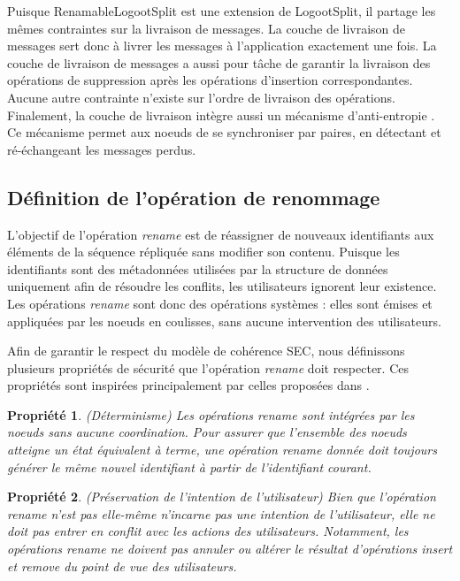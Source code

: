 \documentclass[12pt]{thesul}
\newtheorem{property}{Propriété}
\begin{document}
Puisque RenamableLogootSplit est une extension de LogootSplit, il partage les mêmes contraintes sur la livraison de messages.
La couche de livraison de messages sert donc à livrer les messages à l'application exactement une fois.
La couche de livraison de messages a aussi pour tâche de garantir la livraison des opérations de suppression après les opérations d'insertion correspondantes.
Aucune autre contrainte n'existe sur l'ordre de livraison des opérations.
Finalement, la couche de livraison intègre aussi un mécanisme d'anti-entropie \cite{1983-anti-entropy-vv}.
Ce mécanisme permet aux noeuds de se synchroniser par paires, en détectant et ré-échangeant les messages perdus.

\subsection{Définition de l'opération de renommage}

L'objectif de l'opération \emph{rename} est de réassigner de nouveaux identifiants aux éléments de la séquence répliquée sans modifier son contenu.
Puisque les identifiants sont des métadonnées utilisées par la structure de données uniquement afin de résoudre les conflits, les utilisateurs ignorent leur existence.
Les opérations \emph{rename} sont donc des opérations systèmes : elles sont émises et appliquées par les noeuds en coulisses, sans aucune intervention des utilisateurs.

Afin de garantir le respect du modèle de cohérence \ac{SEC}, nous définissons plusieurs propriétés de sécurité que l'opération \emph{rename} doit respecter.
Ces propriétés sont inspirées principalement par celles proposées dans \cite{zawirski:hal-01248197}.

\begin{property}(Déterminisme)
  Les opérations \emph{rename} sont intégrées par les noeuds sans aucune coordination.
  Pour assurer que l'ensemble des noeuds atteigne un état équivalent à terme, une opération \emph{rename} donnée doit toujours générer le même nouvel identifiant à partir de l'identifiant courant.
\end{property}

\begin{property}(Préservation de l'intention de l'utilisateur)
  Bien que l'opération \emph{rename} n'est pas elle-même n'incarne pas une intention de l'utilisateur, elle ne doit pas entrer en conflit avec les actions des utilisateurs.
  Notamment, les opérations \emph{rename} ne doivent pas annuler ou altérer le résultat d'opérations \emph{insert} et \emph{remove} du point de vue des utilisateurs.
\end{property}
\end{document}
